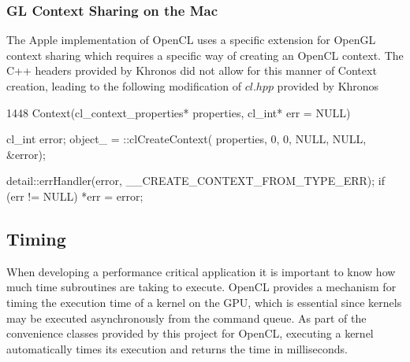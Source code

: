 \subsubsection{GL Context Sharing on the Mac}
The Apple implementation of OpenCL uses a specific extension for OpenGL context sharing which requires a specific way of creating an OpenCL context. The C++ headers provided by Khronos did not allow for this manner of Context creation, leading to the following modification of $cl.hpp$ provided by Khronos
\begin{cppcode}{1448}
Context(cl_context_properties* properties, cl_int* err = NULL)
    {    
        cl_int error;
        object_ = ::clCreateContext(
            properties, 0, 
            0,   
            NULL, NULL, &error);

        detail::errHandler(error, __CREATE_CONTEXT_FROM_TYPE_ERR);
        if (err != NULL) {
            *err = error;
        }    

    }    
\end{cppcode}

\subsection{Timing}

When developing a performance critical application it is important to know how
much time subroutines are taking to execute. OpenCL provides a mechanism for
timing the execution time of a kernel on the GPU, which is essential since
kernels may be executed asynchronously from the command queue. As part of the
convenience classes provided by this project for OpenCL, executing a kernel
automatically times its execution and returns the time in milliseconds.





